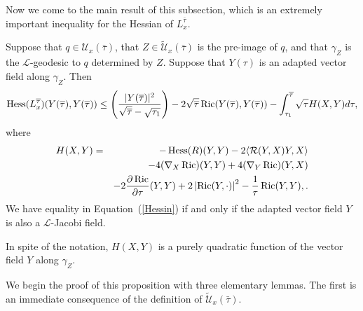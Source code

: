 Now we come to the main result of this subsection, which is an
extremely important inequality for the Hessian of $L_x^{\bar\tau}$.

\begin{proposition}\label{prop:l-length-hessian-inequality}
\label{Hessineq}

Suppose that $q\in {\mathcal U}_x(\bar\tau)$, that $Z\in
\widetilde{\mathcal U}_x(\bar\tau)$ is the pre-image of $q$,  and
that $\gamma_Z$ is the  ${\mathcal L}$-geodesic to $q$ determined by
$Z$. Suppose  that $Y(\tau)$ is an adapted vector field along
$\gamma_Z$. Then
\begin{equation}\label{Hessin}
\operatorname{Hess}(L_x^{\overline\tau})(Y(\overline\tau),Y(\overline\tau)) \leq
\left(\frac{|Y(\overline\tau)|^2}{\sqrt{\overline\tau}-\sqrt{\tau_1}}\right)-
2\sqrt{\overline\tau}\operatorname{Ric}(Y(\overline\tau),Y(\overline\tau)) -
\int_{\tau_1}^{\overline\tau}\sqrt{\tau}H(X,Y)d\tau,
\end{equation} where
\begin{eqnarray} \nonumber
H(X,Y) & =&-\operatorname{Hess}(R)(Y,Y) - 2\langle  {\mathcal R}(Y,X)Y,X\rangle
\\& &-4(\nabla_{X}\operatorname{Ric})(Y,Y) +4(\nabla_{Y}\operatorname{Ric})(Y,X)\label{Heqn}
\\& & - 2\frac{\partial\operatorname{Ric}}{\partial\tau}(Y,Y) + 2\left\vert\operatorname{Ric}(Y,\cdot)\right\vert^{2} -
\frac{1}{\tau}\operatorname{Ric}(Y,Y),\nonumber.
\end{eqnarray}
 We
have equality in Equation~(\ref{Hessin}) if and only if the adapted vector
field $Y$ is also a ${\mathcal L}$-Jacobi field.
\end{proposition}

\begin{remark}[$H(X,Y)$ is quadratic in $Y$]\label{rem:h-quadratic-in-y}

In spite of the notation, $H(X,Y)$ is a purely quadratic function of
the vector field $Y$ along $\gamma_Z$.
\end{remark}

We begin the proof of this proposition with three elementary lemmas. The first
is an immediate consequence of the definition of $\widetilde {\mathcal
U}_x(\bar\tau)$.


